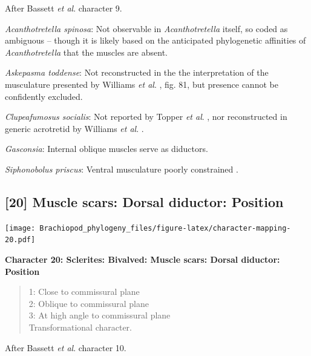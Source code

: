 \documentclass[openany]{book}
\theoremstyle{definition}
\theoremstyle{definition}
\theoremstyle{definition}
\theoremstyle{remark}
\begin{document}
After Bassett \emph{et al}.
\citeyearpar{Bassett2001Functionalmorphology} character 9.

\hypertarget{Acanthotretella_spinosa-coding-19}{}
\emph{Acanthotretella spinosa}: Not observable in \emph{Acanthotretella}
itself, so coded as ambiguous -- though it is likely based on the
anticipated phylogenetic affinities of \emph{Acanthotretella} that the
muscles are absent.

\hypertarget{Askepasma_toddense-coding-19}{}
\emph{Askepasma toddense}: Not reconstructed in the the interpretation
of the musculature presented by Williams \emph{et al}.
\citeyearpar{Williams2000LinguliformeaCraniiformea}, fig. 81, but
presence cannot be confidently excluded.

\hypertarget{Clupeafumosus_socialis-coding-19}{}
\emph{Clupeafumosus socialis}: Not reported by Topper \emph{et al}.
\citeyearpar{Topper2013Reappraisalof}, nor reconstructed in generic
acrotretid by Williams \emph{et al}.
\citeyearpar{Williams2000LinguliformeaCraniiformea}.

\hypertarget{Gasconsia-coding-19}{}
\emph{Gasconsia}: Internal oblique muscles serve as diductors.

\hypertarget{Siphonobolus_priscus-coding-19}{}
\emph{Siphonobolus priscus}: Ventral musculature poorly constrained
\citep{Williams2000LinguliformeaCraniiformea, Popov2009Earlyontogeny}.

\subsection*{{[}20{]} Muscle scars: Dorsal diductor:
Position}\label{muscle-scars-dorsal-diductor-position}

\texttt{[image: Brachiopod\_phylogeny\_files/figure-latex/character-mapping-20.pdf]}

\textbf{Character 20: Sclerites: Bivalved: Muscle scars: Dorsal
diductor: Position}

\begin{quote}
1: Close to commissural plane\\
2: Oblique to commissural plane\\
3: At high angle to commissural plane\\
Transformational character.
\end{quote}

After Bassett \emph{et al}.
\citeyearpar{Bassett2001Functionalmorphology} character 10.
\end{document}

